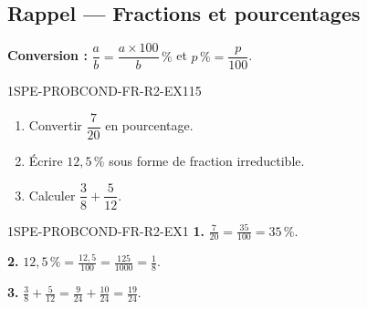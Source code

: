

\subsection*{Rappel --- Fractions et pourcentages}

\textbf{Conversion :} $\dfrac{a}{b} = \dfrac{a \times 100}{b}\,\%$ et $p\,\% = \dfrac{p}{100}$.

\begin{exercice}{1SPE-PROBCOND-FR-R2-EX1}{1}{5}
\begin{enumerate}
  \item Convertir $\dfrac{7}{20}$ en pourcentage.
  \item Écrire $12{,}5\,\%$ sous forme de fraction irreductible.
  \item Calculer $\dfrac{3}{8} + \dfrac{5}{12}$.
\end{enumerate}
\end{exercice}


\begin{corrige}{1SPE-PROBCOND-FR-R2-EX1}
\textbf{1.} $\frac{7}{20} = \frac{35}{100} = 35\,\%$.

\textbf{2.} $12{,}5\,\% = \frac{12{,}5}{100} = \frac{125}{1000} = \frac{1}{8}$.

\textbf{3.} $\frac{3}{8} + \frac{5}{12} = \frac{9}{24} + \frac{10}{24} = \frac{19}{24}$.
\end{corrige}
